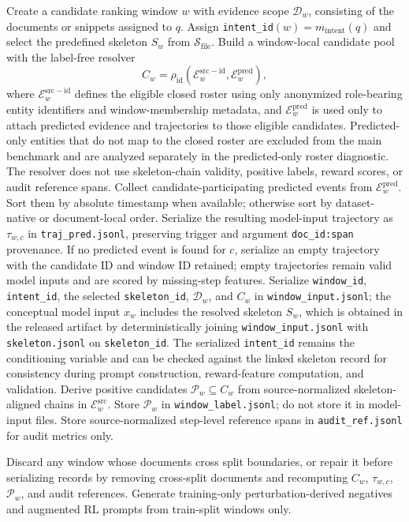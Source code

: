 \documentclass{article}
\begin{document}
\begin{algorithm}[!htbp]
\begin{algorithmic}[1]
    \STATE Create a candidate ranking window $w$ with evidence scope $\mathcal{D}_w$, consisting of the documents or snippets assigned to $q$.
    \STATE Assign \texttt{intent\_id}$(w)=m_{\mathrm{intent}}(q)$ and select the predefined skeleton $S_w$ from $\mathcal{S}_{\mathrm{file}}$.
    \STATE Build a window-local candidate pool with the label-free resolver
    \[
    C_w=\rho_{\mathrm{id}}\!\left(\mathcal{E}^{\mathrm{src-id}}_w,\mathcal{E}^{\mathrm{pred}}_w\right),
    \]
    where $\mathcal{E}^{\mathrm{src-id}}_w$ defines the eligible closed roster using only anonymized role-bearing entity identifiers and window-membership metadata, and $\mathcal{E}^{\mathrm{pred}}_w$ is used only to attach predicted evidence and trajectories to those eligible candidates.
    Predicted-only entities that do not map to the closed roster are excluded from the main benchmark and are analyzed separately in the predicted-only roster diagnostic.
    \STATE The resolver does not use skeleton-chain validity, positive labels, reward scores, or audit reference spans.
        \STATE Collect candidate-participating predicted events from $\mathcal{E}^{\mathrm{pred}}_w$.
        \STATE Sort them by absolute timestamp when available; otherwise sort by dataset-native or document-local order.
        \STATE Serialize the resulting model-input trajectory as $\tau_{w,c}$ in \texttt{traj\_pred.jsonl}, preserving trigger and argument \texttt{doc\_id:span} provenance.
        \STATE If no predicted event is found for $c$, serialize an empty trajectory with the candidate ID and window ID retained; empty trajectories remain valid model inputs and are scored by missing-step features.
    \ENDFOR
    \STATE Serialize \texttt{window\_id}, \texttt{intent\_id}, the selected \texttt{skeleton\_id}, $\mathcal{D}_w$, and $C_w$ in \texttt{window\_input.jsonl}; the conceptual model input $x_w$ includes the resolved skeleton $S_w$, which is obtained in the released artifact by deterministically joining \texttt{window\_input.jsonl} with \texttt{skeleton.jsonl} on \texttt{skeleton\_id}.
    \STATE The serialized \texttt{intent\_id} remains the conditioning variable and can be checked against the linked skeleton record for consistency during prompt construction, reward-feature computation, and validation.
    \STATE Derive positive candidates $\mathcal{P}_w \subseteq C_w$ from source-normalized skeleton-aligned chains in $\mathcal{E}^{\mathrm{src}}_w$.
    \STATE Store $\mathcal{P}_w$ in \texttt{window\_label.jsonl}; do not store it in model-input files.
    \STATE Store source-normalized step-level reference spans in \texttt{audit\_ref.jsonl} for audit metrics only.
\ENDFOR

\STATE Discard any window whose documents cross split boundaries, or repair it before serializing records by removing cross-split documents and recomputing $C_w$, $\tau_{w,c}$, $\mathcal{P}_w$, and audit references.
\STATE Generate training-only perturbation-derived negatives and augmented RL prompts from train-split windows only.
\end{algorithmic}
\end{algorithm}
\end{document}
